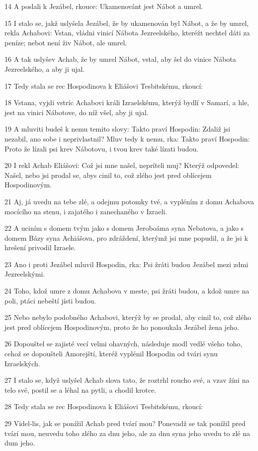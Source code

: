 \par 14 A poslali k Jezábel, rkouce: Ukamenovánt jest Nábot a umrel.
\par 15 I stalo se, jakž uslyšela Jezábel, že by ukamenován byl Nábot, a že by umrel, rekla Achabovi: Vstan, vládni vinicí Nábota Jezreelského, kteréžt nechtel dáti za peníze; nebot není živ Nábot, ale umrel.
\par 16 A tak uslyšev Achab, že by umrel Nábot, vstal, aby šel do vinice Nábota Jezreelského, a aby ji ujal.
\par 17 Tedy stala se rec Hospodinova k Eliášovi Tesbitskému, rkoucí:
\par 18 Vstana, vyjdi vstríc Achabovi králi Izraelskému, kterýž bydlí v Samarí, a hle, jest na vinici Nábotove, do níž všel, aby ji ujal.
\par 19 A mluviti budeš k nemu temito slovy: Takto praví Hospodin: Zdaliž jsi nezabil, ano sobe i neprivlastnil? Mluv tedy k nemu, rka: Takto praví Hospodin: Proto že lízali psi krev Nábotovu, i tvou krev také lízati budou.
\par 20 I rekl Achab Eliášovi: Což jsi mne našel, nepríteli muj? Kterýž odpovedel: Našel, nebo jsi prodal se, abys cinil to, což zlého jest pred oblícejem Hospodinovým.
\par 21 Aj, já uvedu na tebe zlé, a odejmu potomky tvé, a vypléním z domu Achabova mocícího na stenu, i zajatého i zanechaného v Izraeli.
\par 22 A uciním s domem tvým jako s domem Jeroboáma syna Nebatova, a jako s domem Bázy syna Achiášova, pro zdráždení, kterýmž jsi mne popudil, a že jsi k hrešení privodil Izraele.
\par 23 Ano i proti Jezábel mluvil Hospodin, rka: Psi žráti budou Jezábel mezi zdmi Jezreelskými.
\par 24 Toho, kdož umre z domu Achabova v meste, psi žráti budou, a kdož umre na poli, ptáci nebeští jísti budou.
\par 25 Nebo nebylo podobného Achabovi, kterýž by se prodal, aby cinil to, což zlého jest pred oblícejem Hospodinovým, proto že ho ponoukala Jezábel žena jeho.
\par 26 Dopouštel se zajisté vecí velmi ohavných, následuje modl vedlé všeho toho, cehož se dopoušteli Amorejští, kteréž vyplénil Hospodin od tvári synu Izraelských.
\par 27 I stalo se, když uslyšel Achab slova tato, že roztrhl roucho své, a vzav žíni na telo své, postil se a léhal na pytli, a chodil krotce.
\par 28 Tedy stala se rec Hospodinova k Eliášovi Tesbitskému, rkoucí:
\par 29 Videl-lis, jak se ponížil Achab pred tvárí mou? Ponevadž se tak ponížil pred tvárí mou, neuvedu toho zlého za dnu jeho, ale za dnu syna jeho uvedu to zlé na dum jeho.

